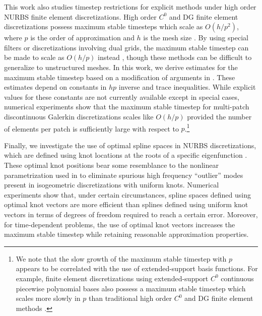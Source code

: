 \documentclass[preprint,10pt]{elsarticle}
\begin{document}
This work also studies timestep restrictions for explicit methods under high order NURBS finite element discretizations.  High order $C^0$ and DG finite element discretizations possess maximum stable timesteps which scale as $O(h/p^2)$, where $p$ is the order of approximation {\color{forestgreen} and $h$ is the mesh size} \cite{warburton2008taming}.  By using special filters or discretizations involving dual grids, the maximum stable timestep can be made to scale as $O(h/p)$ instead \cite{warburton2008taming, reyna2014operator}, though these methods can be difficult to generalize to unstructured meshes.  In this work, we derive estimates for the maximum stable timestep based on a modification of arguments in \cite{chan2015gpu}.  These estimates depend on constants in $hp$ inverse and trace inequalities.  
While explicit values for these constants are not currently available except in special cases, numerical experiments show that the maximum stable timestep for multi-patch discontinuous Galerkin discretizations scales like $O(h/p)$ provided the number of elements per patch is sufficiently large with respect to $p$.\footnote{We note that the slow growth of the maximum stable timestep with $p$ appears to be correlated with the use of extended-support basis functions.  For example, finite element discretizations using extended-support $C^0$ continuous piecewise polynomial bases also possess a maximum stable timestep which scales more slowly in $p$ than traditional high order $C^0$ and DG finite element methods \cite{banks2016galerkin}.}

Finally, we investigate the use of optimal spline spaces in NURBS discretizations, which are defined using knot locations at the roots of a specific eigenfunction \cite{melkman1978spline}.  These optimal knot positions bear some resemblance to the nonlinear parametrization used in \cite{cottrell2006isogeometric} to eliminate spurious high frequency ``outlier'' modes present in isogeometric discretizations with uniform knots.  Numerical experiments show that, under certain circumstances, spline spaces defined using optimal knot vectors are more efficient than splines defined using uniform knot vectors in terms of degrees of freedom required to reach a certain error.  Moreover, for time-dependent problems, the use of optimal knot vectors increases the maximum stable timestep while retaining reasonable approximation properties.  
\end{document}
